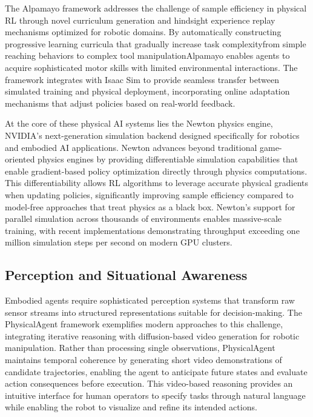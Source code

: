 The Alpamayo framework addresses the challenge of sample efficiency in physical RL through novel curriculum generation and hindsight experience replay mechanisms optimized for robotic domains. By automatically constructing progressive learning curricula that gradually increase task complexityfrom simple reaching behaviors to complex tool manipulationAlpamayo enables agents to acquire sophisticated motor skills with limited environmental interactions. The framework integrates with Isaac Sim to provide seamless transfer between simulated training and physical deployment, incorporating online adaptation mechanisms that adjust policies based on real-world feedback.

At the core of these physical AI systems lies the Newton physics engine, NVIDIA's next-generation simulation backend designed specifically for robotics and embodied AI applications. Newton advances beyond traditional game-oriented physics engines by providing differentiable simulation capabilities that enable gradient-based policy optimization directly through physics computations. This differentiability allows RL algorithms to leverage accurate physical gradients when updating policies, significantly improving sample efficiency compared to model-free approaches that treat physics as a black box. Newton's support for parallel simulation across thousands of environments enables massive-scale training, with recent implementations demonstrating throughput exceeding one million simulation steps per second on modern GPU clusters.

\subsection{Perception and Situational Awareness}

Embodied agents require sophisticated perception systems that transform raw sensor streams into structured representations suitable for decision-making. The PhysicalAgent framework exemplifies modern approaches to this challenge, integrating iterative reasoning with diffusion-based video generation for robotic manipulation. Rather than processing single observations, PhysicalAgent maintains temporal coherence by generating short video demonstrations of candidate trajectories, enabling the agent to anticipate future states and evaluate action consequences before execution. This video-based reasoning provides an intuitive interface for human operators to specify tasks through natural language while enabling the robot to visualize and refine its intended actions.

